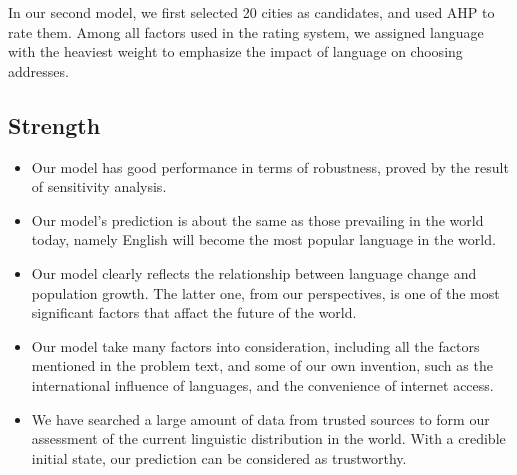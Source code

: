 \documentclass{mcmthesis}
\begin{document}
In our second model, we first selected 20 cities as candidates, and used AHP to rate them. Among all factors used in the rating system, we assigned language with the heaviest weight to emphasize the impact of language on choosing addresses.
\subsection{Strength}
\begin{itemize}
    \item Our model has good performance in terms of robustness, proved by the result of sensitivity analysis.
    \item Our model's prediction is about the same as those prevailing in the world today, namely English will become the most popular language in the world.
    \item Our model clearly reflects the relationship between language change and population growth. The latter one, from our perspectives, is one of the most significant factors that affact the future of the world.
    \item Our model take many factors into consideration, including all the factors mentioned in the problem text, and some of our own invention, such as the international influence of languages, and the convenience of internet access.
    \item We have searched a large amount of data from trusted sources to form our assessment of the current linguistic distribution in the world. With a credible initial state, our prediction can be considered as trustworthy.
\end{itemize}
\end{document}
